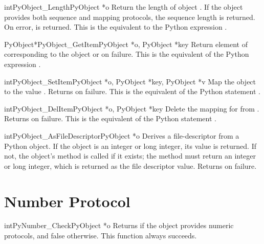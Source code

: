 \documentclass{manual}
\begin{document}
\begin{cfuncdesc}{int}{PyObject_Length}{PyObject *o}
Return the length of object .  If the object  provides
both sequence and mapping protocols, the sequence length is
returned.  On error,  is returned.  This is the equivalent
to the Python expression .
\end{cfuncdesc}


\begin{cfuncdesc}{PyObject*}{PyObject_GetItem}{PyObject *o, PyObject *key}
Return element of  corresponding to the object  or
\NULL{} on failure. This is the equivalent of the Python expression
.
\end{cfuncdesc}


\begin{cfuncdesc}{int}{PyObject_SetItem}{PyObject *o, PyObject *key, PyObject *v}
Map the object  to the value .
Returns  on failure.  This is the equivalent
of the Python statement .
\end{cfuncdesc}


\begin{cfuncdesc}{int}{PyObject_DelItem}{PyObject *o, PyObject *key}
Delete the mapping for  from .  Returns  on
failure. This is the equivalent of the Python statement .
\end{cfuncdesc}

\begin{cfuncdesc}{int}{PyObject_AsFileDescriptor}{PyObject *o}
Derives a file-descriptor from a Python object.  If the object
is an integer or long integer, its value is returned.  If not, the
object's  method is called if it exists; the method
must return an integer or long integer, which is returned as the file
descriptor value.  Returns  on failure.
\end{cfuncdesc}

\section{Number Protocol \label{number}}

\begin{cfuncdesc}{int}{PyNumber_Check}{PyObject *o}
Returns  if the object  provides numeric protocols, and
false otherwise. 
This function always succeeds.
\end{cfuncdesc}
\end{document}
